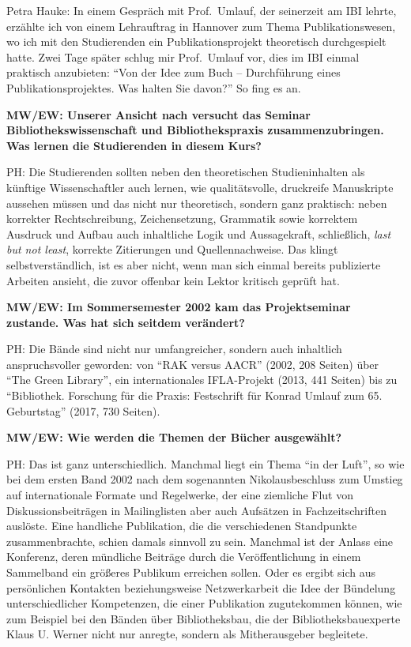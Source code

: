 \documentclass[a4paper,
fontsize=11pt,
oneside,
numbers=noperiodatend,
parskip=half-,
bibliography=totoc,
final
]{scrartcl}
\begin{document}
Petra Hauke: In einem Gespräch mit Prof.~Umlauf, der seinerzeit am IBI
lehrte, erzählte ich von einem Lehrauftrag in Hannover zum Thema
Publikationswesen, wo ich mit den Studierenden ein Publikationsprojekt
theoretisch durchgespielt hatte. Zwei Tage später schlug mir
Prof.~Umlauf vor, dies im IBI einmal praktisch anzubieten: \enquote{Von
der Idee zum Buch -- Durchführung eines Publikationsprojektes. Was
halten Sie davon?} So fing es an.

\textbf{MW/EW: Unserer Ansicht nach versucht das Seminar
Bibliothekswissenschaft und Bibliothekspraxis zusammenzubringen. Was
lernen die Studierenden in diesem Kurs?}

PH: Die Studierenden sollten neben den theoretischen Studieninhalten als
künftige Wissenschaftler auch lernen, wie qualitätsvolle, druckreife
Manuskripte aussehen müssen und das nicht nur theoretisch, sondern ganz
praktisch: neben korrekter Rechtschreibung, Zeichensetzung, Grammatik
sowie korrektem Ausdruck und Aufbau auch inhaltliche Logik und
Aussagekraft, schließlich, \emph{last but not least}, korrekte
Zitierungen und Quellennachweise. Das klingt selbstverständlich, ist es
aber nicht, wenn man sich einmal bereits publizierte Arbeiten ansieht,
die zuvor offenbar kein Lektor kritisch geprüft hat.

\textbf{MW/EW: Im Sommersemester 2002 kam das Projektseminar zustande.
Was hat sich seitdem verändert?}

PH: Die Bände sind nicht nur umfangreicher, sondern auch inhaltlich
anspruchsvoller geworden: von \enquote{RAK versus AACR} (2002, 208
Seiten) über \enquote{The Green Library}, ein internationales
IFLA-Projekt (2013, 441 Seiten) bis zu \enquote{Bibliothek. Forschung
für die Praxis: Festschrift für Konrad Umlauf zum 65. Geburtstag} (2017,
730 Seiten).

\textbf{MW/EW: Wie werden die Themen der Bücher ausgewählt?}

PH: Das ist ganz unterschiedlich. Manchmal liegt ein Thema \enquote{in
der Luft}, so wie bei dem ersten Band 2002 nach dem sogenannten
Nikolausbeschluss zum Umstieg auf internationale Formate und Regelwerke,
der eine ziemliche Flut von Diskussionsbeiträgen in Mailinglisten aber
auch Aufsätzen in Fachzeitschriften auslöste. Eine handliche
Publikation, die die verschiedenen Standpunkte zusammenbrachte, schien
damals sinnvoll zu sein. Manchmal ist der Anlass eine Konferenz, deren
mündliche Beiträge durch die Veröffentlichung in einem Sammelband ein
größeres Publikum erreichen sollen. Oder es ergibt sich aus persönlichen
Kontakten beziehungsweise Netzwerkarbeit die Idee der Bündelung
unterschiedlicher Kompetenzen, die einer Publikation zugutekommen
können, wie zum Beispiel bei den Bänden über Bibliotheksbau, die der
Bibliotheksbauexperte Klaus U. Werner nicht nur anregte, sondern als
Mitherausgeber begleitete.
\end{document}
